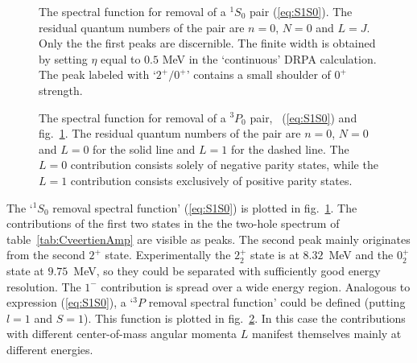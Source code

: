 \begin{figure}
\centerline{%
}
\caption[]{%
The spectral function for removal of a $^1S_0$ pair (\ref{eq:S1S0}). The residual
quantum numbers of the pair are $n=0$, $N=0$ and $L=J$. Only the the first peaks
are discernible. The finite width is obtained by setting $\eta$ equal to $0.5$ 
MeV in the `continuous' DRPA calculation. The peak labeled with `$2^+/0^+$' 
contains a small shoulder of $0^+$ strength.
\label{fig:S1S0}}
\end{figure}
\begin{figure}
\centerline{%
}
\caption[]{%
The spectral function for removal of a $^3P_0$ pair, \cf\ (\ref{eq:S1S0}) and 
fig.~\ref{fig:S1S0}. The residual
quantum numbers of the pair are $n=0$, $N=0$ and $L=0$ for the solid line and 
 $L=1$ for the dashed line. The $L=0$ contribution consists solely of negative
parity states, while the $L=1$ contribution consists exclusively of positive
parity states.
\label{fig:S3P}}
\end{figure}
The `$^1S_0$ removal spectral function' (\ref{eq:S1S0}) is plotted
in fig.~\ref{fig:S1S0}. The contributions of the first two states in the 
the two-hole spectrum of table~\ref{tab:CveertienAmp} are visible as peaks.
The second peak mainly originates from the second $2^+$ state. 
Experimentally\cite{Ajz1617,Ajz1315} the $2^+_2$ state is at $8.32$~MeV and the 
$0^+_2$ state at $9.75$~MeV, so they could be separated with sufficiently good 
energy resolution. The $1^-$ contribution is spread over a wide energy region.
Analogous to expression
(\ref{eq:S1S0}), a `$^3P$ removal spectral function' could be 
defined (putting $l=1$ and $S=1$). This function is plotted in
fig.~\ref{fig:S3P}. In this case the contributions with different 
center-of-mass angular momenta $L$ manifest themselves mainly at different 
energies.

